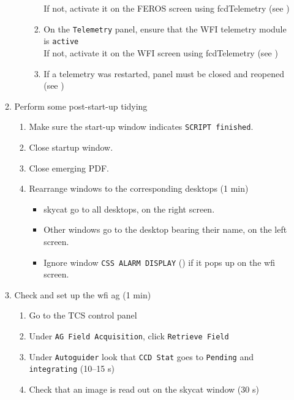 \documentclass[11pt,fleqn,a4paper]{book}
\begin{document}
\begin{enumerate}
\begin{enumerate}
\begin{enumerate}
\begin{enumerate}
                       If not, activate it on the FEROS screen using \gls{fcdTelemetry} (see )
                 \item On the \texttt{Telemetry} panel, ensure that the WFI \gls{telemetry} module is \texttt{active}\\
                       If not, activate it on the WFI screen using \gls{fcdTelemetry} (see )
                 \item If a \gls{telemetry} was restarted, panel must be closed and reopened (see )
                 \end{enumerate}
          \end{enumerate}
          \item Perform some post-start-up tidying
                \begin{enumerate}
                   \item Make sure the start-up window indicates \texttt{SCRIPT finished}.\label{list:tcsbooted}
                   \item Close startup window.
                   \item Close emerging PDF.
                   \item Rearrange windows to the corresponding \gls{desktop}s (1 min)
             \begin{itemize}
                \item \gls{skycat} go to all \gls{desktop}s, on the right screen.
                \item Other windows go to the \gls{desktop} bearing their name, on the left screen. 
                \item Ignore window \texttt{CSS ALARM DISPLAY} () if it pops up on the \gls{wfi} screen.
             \end{itemize}     
                \end{enumerate}
          \item Check and set up the \gls{wfi} \gls{ag} (1 min)
          \begin{enumerate}
                \item Go to the \gls{TCS control panel}
                \item Under \texttt{AG Field Acquisition}, click \texttt{Retrieve Field}
                \item\label{list:ccdstat} Under \texttt{Autoguider} look that \texttt{CCD Stat} goes to \texttt{Pending} and \texttt{integrating} (10--15 s)
                \item\label{list:skycatro} Check that an image is read out on the \gls{skycat} window (30 s)

\end{enumerate}
\end{enumerate}
\end{enumerate}
\end{document}
